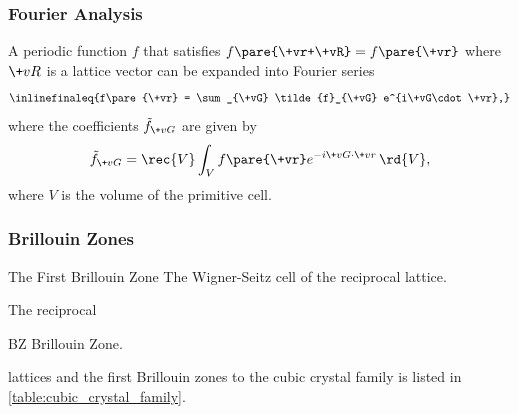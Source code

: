 \documentclass[hidelinks]{article}
\begin{document}
\subsubsection{Fourier Analysis} %
\label{ssub:fourier_analysis}

A periodic function $f$ that satisfies $f\pare{\+vr+\+vR} = f\pare{\+vr}$ where $\+vR$ is a lattice vector can be expanded into Fourier series
\[ \inlinefinaleq{f\pare{\+vr} = \sum_{\+vG} \tilde{f}_{\+vG} e^{i\+vG\cdot \+vr},} \]
where the coefficients $\tilde{f}_{\+vG}$ are given by
\[ \tilde{f}_{\+vG} = \rec{V}\int_{V} f\pare{\+vr} e^{-i\+vG\cdot \+vr}\,\rd{V}, \]
where $V$ is the volume of the primitive cell.


\subsubsection{Brillouin Zones} %
\label{ssub:brillouin_zones}

\begin{termdef}{The First Brillouin Zone}
    The Wigner-Seitz cell of the reciprocal lattice.
\end{termdef}
The reciprocal \begin{margindef}{BZ}
    Brillouin Zone.
\end{margindef} lattices and the first Brillouin zones to the cubic crystal family is listed in \cref{table:cubic_crystal_family}.
\end{document}

